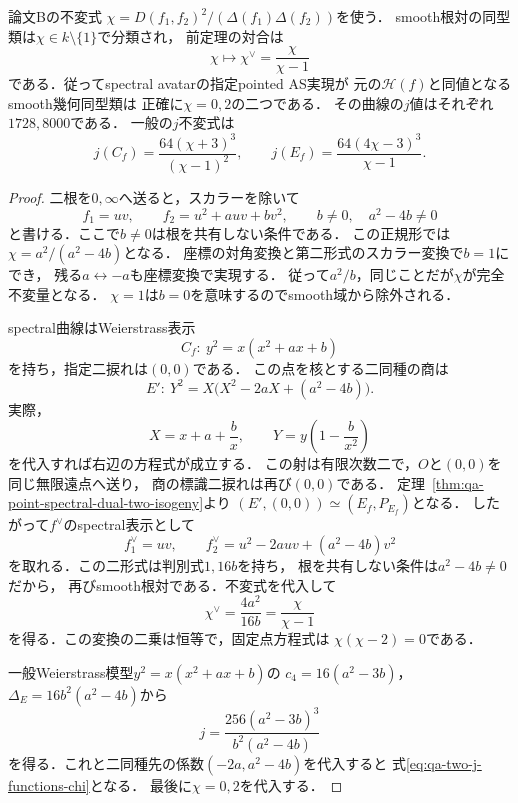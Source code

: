 \begin{proposition}
\label{prop:qa-spectral-atkin-lehner-chi}
論文Bの不変式
$\chi=D(f_1,f_2)^2/(\Delta(f_1)\Delta(f_2))$を使う．
smooth根対の同型類は$\chi\in k\setminus\{1\}$で分類され，
前定理の対合は
\begin{equation}
\chi\longmapsto\chi^\vee=\frac{\chi}{\chi-1}
\label{eq:qa-spectral-atkin-lehner-chi}
\end{equation}
である．従ってspectral avatarの指定pointed AS実現が
元の$\mathcal H(f)$と同値となるsmooth幾何同型類は
正確に$\chi=0,2$の二つである．
その曲線の$j$値はそれぞれ$1728,8000$である．
一般の$j$不変式は
\begin{equation}
j(C_f)=\frac{64(\chi+3)^3}{(\chi-1)^2},\qquad
j(E_f)=\frac{64(4\chi-3)^3}{\chi-1}.
\label{eq:qa-two-j-functions-chi}
\end{equation}
\end{proposition}
\begin{proof}
二根を$0,\infty$へ送ると，スカラーを除いて
\[
f_1=uv,\qquad f_2=u^2+a uv+bv^2,
\qquad b\ne0,\quad a^2-4b\ne0
\]
と書ける．ここで$b\ne0$は根を共有しない条件である．
この正規形では
$\chi=a^2/(a^2-4b)$となる．
座標の対角変換と第二形式のスカラー変換で$b=1$にでき，
残る$a\leftrightarrow-a$も座標変換で実現する．
従って$a^2/b$，同じことだが$\chi$が完全不変量となる．
$\chi=1$は$b=0$を意味するのでsmooth域から除外される．

spectral曲線はWeierstrass表示
\[
C_f:\ y^2=x(x^2+ax+b)
\]
を持ち，指定二捩れは$(0,0)$である．
この点を核とする二同種の商は
\[
E':\ Y^2=X\bigl(X^2-2aX+(a^2-4b)\bigr).
\]
実際，
\[
X=x+a+\frac b x,\qquad
Y=y\left(1-\frac b{x^2}\right)
\]
を代入すれば右辺の方程式が成立する．
この射は有限次数二で，$O$と$(0,0)$を同じ無限遠点へ送り，
商の標識二捩れは再び$(0,0)$である．
定理~\ref{thm:qa-point-spectral-dual-two-isogeny}より
$(E',(0,0))\simeq(E_f,P_{E_f})$となる．
したがって$f^\vee$のspectral表示として
\[
f_1^\vee=uv,\qquad
f_2^\vee=u^2-2a uv+(a^2-4b)v^2
\]
を取れる．この二形式は判別式$1,16b$を持ち，
根を共有しない条件は$a^2-4b\ne0$だから，
再びsmooth根対である．不変式を代入して
\[
\chi^\vee=\frac{4a^2}{16b}
=\frac{\chi}{\chi-1}
\]
を得る．この変換の二乗は恒等で，固定点方程式は
$\chi(\chi-2)=0$である．

一般Weierstrass模型$y^2=x(x^2+ax+b)$の
$c_4=16(a^2-3b)$，$\Delta_E=16b^2(a^2-4b)$から
\[
j=\frac{256(a^2-3b)^3}{b^2(a^2-4b)}
\]
を得る．これと二同種先の係数$(-2a,a^2-4b)$を代入すると
式\eqref{eq:qa-two-j-functions-chi}となる．
最後に$\chi=0,2$を代入する．
\end{proof}


